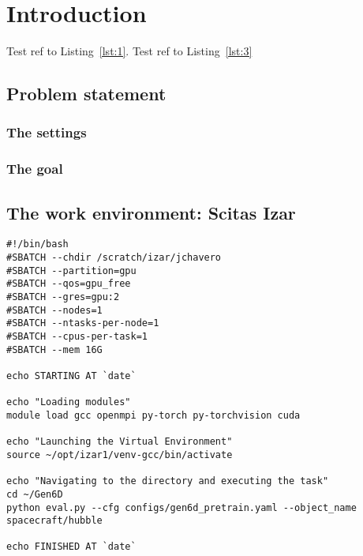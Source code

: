 
\chapter{Introduction}\label{chapter:introduction}
Test ref to Listing~\ref{lst:1}. Test ref to Listing~\ref{lst:3}
\section{Problem statement}
\subsection{The settings}
\subsection{The goal}
\section{The work environment: Scitas Izar}

\begin{lstlisting}[style=bashstyle, caption={Bash script \texttt{execute.sh} to run a machine learning model on Scitas Izar EPFL. While the overall structure remains consistent, this script is specific to Gen6D's architecture, further discussed later.}]
#!/bin/bash
#SBATCH --chdir /scratch/izar/jchavero
#SBATCH --partition=gpu
#SBATCH --qos=gpu_free
#SBATCH --gres=gpu:2
#SBATCH --nodes=1
#SBATCH --ntasks-per-node=1
#SBATCH --cpus-per-task=1
#SBATCH --mem 16G

echo STARTING AT `date`

echo "Loading modules"
module load gcc openmpi py-torch py-torchvision cuda

echo "Launching the Virtual Environment"
source ~/opt/izar1/venv-gcc/bin/activate

echo "Navigating to the directory and executing the task"
cd ~/Gen6D                                    
python eval.py --cfg configs/gen6d_pretrain.yaml --object_name spacecraft/hubble

echo FINISHED AT `date`
\end{lstlisting}